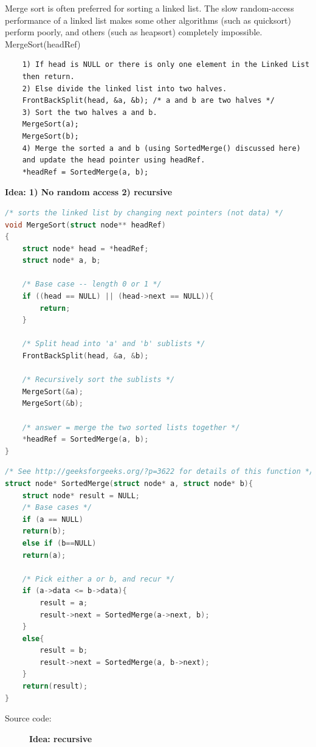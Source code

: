 \documentclass[a4paper,11pt,twoside]{book}
\begin{document}
	\par Merge sort is often preferred for sorting a linked list. The slow random-access performance of a linked list makes some other algorithms (such as quicksort) perform poorly, and others (such as heapsort) completely impossible. MergeSort(headRef)
	
\begin{verbatim}
	1) If head is NULL or there is only one element in the Linked List 
	then return.
	2) Else divide the linked list into two halves.  
	FrontBackSplit(head, &a, &b); /* a and b are two halves */
	3) Sort the two halves a and b.
	MergeSort(a);
	MergeSort(b);
	4) Merge the sorted a and b (using SortedMerge() discussed here) 
	and update the head pointer using headRef.
	*headRef = SortedMerge(a, b);
\end{verbatim}
\textbf{Idea: 1) No random access 2) recursive}

\begin{lstlisting}[frame=single, language=c++] 
/* sorts the linked list by changing next pointers (not data) */
void MergeSort(struct node** headRef)
{
	struct node* head = *headRef;
	struct node* a, b;
	
	/* Base case -- length 0 or 1 */
	if ((head == NULL) || (head->next == NULL)){
		return;
	}
	
	/* Split head into 'a' and 'b' sublists */
	FrontBackSplit(head, &a, &b); 
	
	/* Recursively sort the sublists */
	MergeSort(&a);
	MergeSort(&b);
	
	/* answer = merge the two sorted lists together */
	*headRef = SortedMerge(a, b);
}		
\end{lstlisting}

\begin{lstlisting}[frame=single, language=c++] 
/* See http://geeksforgeeks.org/?p=3622 for details of this function */
struct node* SortedMerge(struct node* a, struct node* b){
	struct node* result = NULL;	
	/* Base cases */
	if (a == NULL)
	return(b);
	else if (b==NULL)
	return(a);
	
	/* Pick either a or b, and recur */
	if (a->data <= b->data){
		result = a;
		result->next = SortedMerge(a->next, b);
	}
	else{
		result = b;
		result->next = SortedMerge(a, b->next);
	}
	return(result);
}	
\end{lstlisting}
\begin{description}
	\item[Source code:] \textbf{Idea: recursive}
\end{description}
\end{document}
